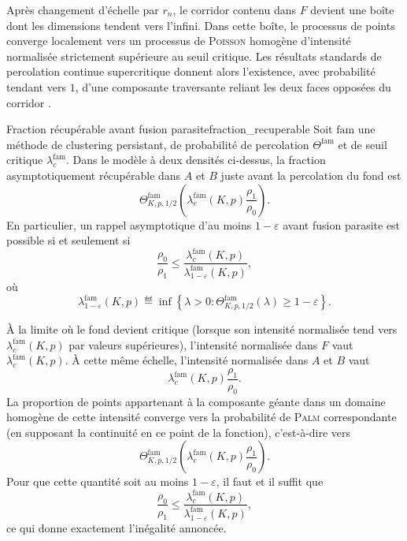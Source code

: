 \begin{Preuve}
Après changement d'échelle par $r_n$, le corridor contenu dans $F$ devient une boîte dont les dimensions tendent vers l'infini. Dans cette boîte, le processus de points converge localement vers un processus de \textsc{Poisson} homogène d'intensité normalisée strictement supérieure au seuil critique. Les résultats standards de percolation continue supercritique donnent alors l'existence, avec probabilité tendant vers $1$, d'une composante traversante reliant les deux faces opposées du corridor \cite{MeesterRoy, penrose2003}.

\end{Preuve}

\begin{Theoreme}{Fraction récupérable avant fusion parasite}{fraction_recuperable}
Soit $\mathrm{fam}$ une méthode de clustering persistant, de probabilité de percolation $\Theta^{\mathrm{fam}}$ et de seuil critique $\lambda_c^{\mathrm{fam}}$. Dans le modèle à deux densités ci-dessus, la fraction asymptotiquement récupérable dans $A$ et $B$ juste avant la percolation du fond est
\[
    \Theta^{\mathrm{fam}}_{K,p,1/2}\left(
        \lambda_c^{\mathrm{fam}}(K,p)\frac{\rho_1}{\rho_0}
    \right).
\]
En particulier, un rappel asymptotique d'au moins $1-\varepsilon$ avant fusion parasite est possible si et seulement si
\[
    \frac{\rho_0}{\rho_1}
    \le
    \frac{\lambda_c^{\mathrm{fam}}(K,p)}
         {\lambda^{\mathrm{fam}}_{1-\varepsilon}(K,p)},
\]
où
\[
    \lambda^{\mathrm{fam}}_{1-\varepsilon}(K,p)
    \eqdef
    \inf\left\{\lambda>0:
    \Theta^{\mathrm{fam}}_{K,p,1/2}(\lambda)\ge 1-\varepsilon
    \right\}.
\]
\end{Theoreme}

\begin{Preuve}
À la limite où le fond devient critique (lorsque son intensité normalisée tend vers $\lambda_c^{\mathrm{fam}}(K,p)$ par valeurs supérieures), l'intensité normalisée dans $F$ vaut $\lambda_c^{\mathrm{fam}}(K,p)$. À cette même échelle, l'intensité normalisée dans $A$ et $B$ vaut
\[
    \lambda_c^{\mathrm{fam}}(K,p)\frac{\rho_1}{\rho_0}.
\]
La proportion de points appartenant à la composante géante dans un domaine homogène de cette intensité converge vers la probabilité de \textsc{Palm} correspondante (en supposant la continuité en ce point de la fonction), c'est-à-dire vers
\[
    \Theta^{\mathrm{fam}}_{K,p,1/2}\left(
        \lambda_c^{\mathrm{fam}}(K,p)\frac{\rho_1}{\rho_0}
    \right).
\]
Pour que cette quantité soit au moins $1-\varepsilon$, il faut et il suffit que
\[
    \frac{\rho_0}{\rho_1}
    \le
    \frac{\lambda_c^{\mathrm{fam}}(K,p)}
         {\lambda^{\mathrm{fam}}_{1-\varepsilon}(K,p)},
\]
ce qui donne exactement l'inégalité annoncée.
\end{Preuve}


